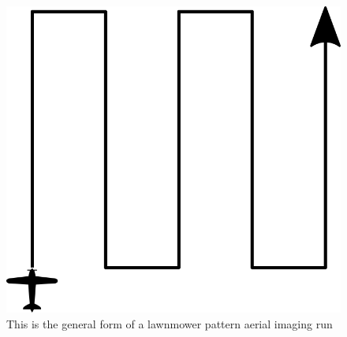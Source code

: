 \begin{figure}[htbp!] 
\centering    
\includegraphics[width=1.0\textwidth]{SimpleLawnmower}
\caption[Simple Lawnmower]{This is the general form of a lawnmower pattern aerial imaging run} %
\label{fig:simplelawnmower}
\end{figure}


